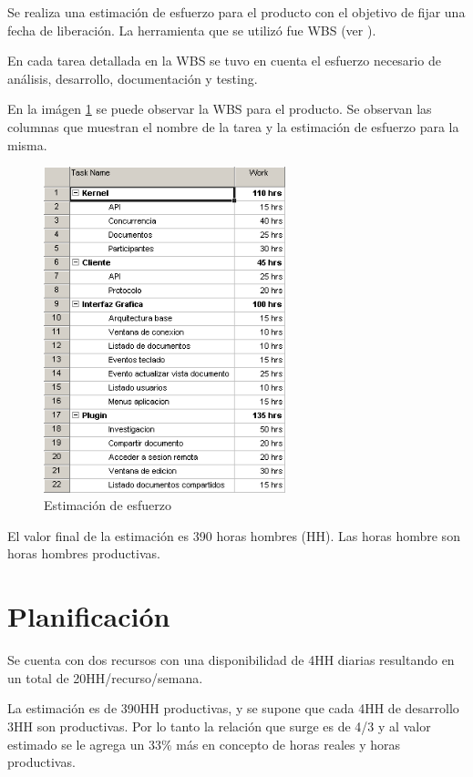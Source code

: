 \documentclass[12pt,a4paper]{article}
\begin{document}
	Se realiza una estimación de esfuerzo para el producto con el objetivo de fijar una fecha de liberación. La herramienta que se utilizó fue WBS (ver \cite{wbs}).

	En cada tarea detallada en la WBS se tuvo en cuenta el esfuerzo necesario de análisis, desarrollo, documentación y testing.

	En la imágen \ref{WBS} se puede observar la WBS para el producto. Se observan las columnas que muestran el nombre de la tarea y la estimación de esfuerzo para la misma.

	\begin{figure}[H]
		\begin{center}
			\includegraphics[width=7cm]{wbs.png}
			\caption{\label{WBS} Estimación de esfuerzo }
		\end{center}
	\end{figure}

	El valor final de la estimación es 390 horas hombres (HH). Las horas hombre son horas hombres productivas.

	\section{Planificación}

	Se cuenta con dos recursos con una disponibilidad de 4HH diarias resultando en un total de 20HH/recurso/semana.

	La estimación es de 390HH productivas, y se supone que cada 4HH de desarrollo 3HH son productivas. Por lo tanto la relación que surge es de 4/3 y al valor estimado se le agrega un 33\% más en concepto de horas reales y horas productivas.
\end{document}
